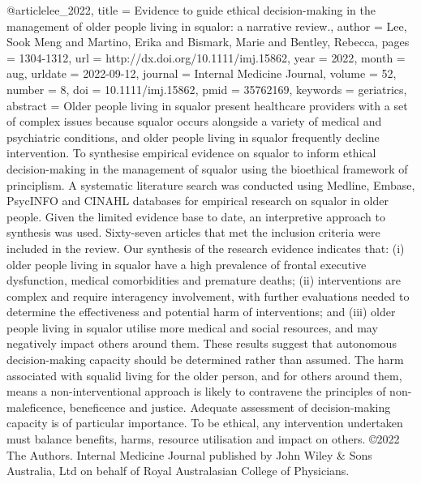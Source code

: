 @article{lee_2022,
title = {Evidence to guide ethical decision-making in the management of older people living in squalor: a narrative review.},
author = {Lee, Sook Meng and Martino, Erika and Bismark, Marie and Bentley, Rebecca},
pages = {1304-1312},
url = {http://dx.doi.org/10.1111/imj.15862},
year = {2022},
month = {aug},
urldate = {2022-09-12},
journal = {Internal Medicine Journal},
volume = {52},
number = {8},
doi = {10.1111/imj.15862},
pmid = {35762169},
keywords = {geriatrics},
abstract = {Older people living in squalor present healthcare providers with a set of complex issues because squalor occurs alongside a variety of medical and psychiatric conditions, and older people living in squalor frequently decline intervention. To synthesise empirical evidence on squalor to inform ethical decision-making in the management of squalor using the bioethical framework of principlism. A systematic literature search was conducted using Medline, Embase, {PsycINFO} and {CINAHL} databases for empirical research on squalor in older people. Given the limited evidence base to date, an interpretive approach to synthesis was used. Sixty-seven articles that met the inclusion criteria were included in the review. Our synthesis of the research evidence indicates that: (i) older people living in squalor have a high prevalence of frontal executive dysfunction, medical comorbidities and premature deaths; (ii) interventions are complex and require interagency involvement, with further evaluations needed to determine the effectiveness and potential harm of interventions; and (iii) older people living in squalor utilise more medical and social resources, and may negatively impact others around them. These results suggest that autonomous decision-making capacity should be determined rather than assumed. The harm associated with squalid living for the older person, and for others around them, means a non-interventional approach is likely to contravene the principles of non-maleficence, beneficence and justice. Adequate assessment of decision-making capacity is of particular importance. To be ethical, any intervention undertaken must balance benefits, harms, resource utilisation and impact on others. \copyright 2022 The Authors. Internal Medicine Journal published by John Wiley \& Sons Australia, Ltd on behalf of Royal Australasian College of Physicians.}
}
